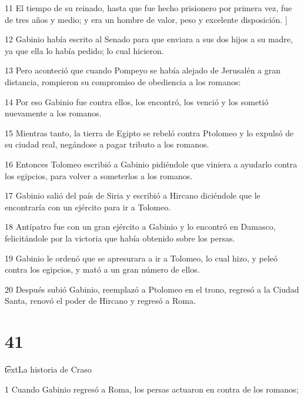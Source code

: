 \par 11 El tiempo de su reinado, hasta que fue hecho prisionero por primera vez, fue de tres años y medio; y era un hombre de valor, peso y excelente disposición. ]

\par 12 Gabinio había escrito al Senado para que enviara a sus dos hijos a su madre, ya que ella lo había pedido; lo cual hicieron.

\par 13 Pero aconteció que cuando Pompeyo se había alejado de Jerusalén a gran distancia, rompieron su compromiso de obediencia a los romanos:

\par 14 Por eso Gabinio fue contra ellos, los encontró, los venció y los sometió nuevamente a los romanos.

\par 15 Mientras tanto, la tierra de Egipto se rebeló contra Ptolomeo y lo expulsó de su ciudad real, negándose a pagar tributo a los romanos.

\par 16 Entonces Tolomeo escribió a Gabinio pidiéndole que viniera a ayudarlo contra los egipcios, para volver a someterlos a los romanos.

\par 17 Gabinio salió del país de Siria y escribió a Hircano diciéndole que le encontraría con un ejército para ir a Tolomeo.

\par 18 Antípatro fue con un gran ejército a Gabinio y lo encontró en Damasco, felicitándole por la victoria que había obtenido sobre los persas.

\par 19 Gabinio le ordenó que se apresurara a ir a Tolomeo, lo cual hizo, y peleó contra los egipcios, y mató a un gran número de ellos.

\par 20 Después subió Gabinio, reemplazó a Ptolomeo en el trono, regresó a la Ciudad Santa, renovó el poder de Hircano y regresó a Roma.


\chapter{41}

\par \t text{La historia de Craso}

\par 1 Cuando Gabinio regresó a Roma, los persas actuaron en contra de los romanos;

